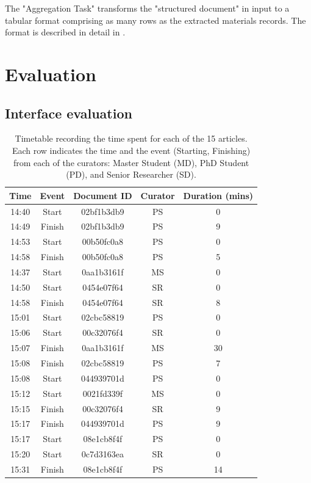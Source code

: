 The "Aggregation Task" transforms the "structured document" in input to a tabular format comprising as many rows as the extracted materials records. The format is described in detail in \cite{lfoppiano2023automatic}.

\section{Evaluation}
\label{app:interface-evaluation-raw}
\subsection{Interface evaluation}

\begin{table}[h]
\centering
\small
\caption{Timetable recording the time spent for each of the 15 articles. Each row indicates the time and the event (Starting, Finishing) from each of the curators: Master Student (MD), PhD Student (PD), and Senior Researcher (SD).}
\begin{tabular}{cc|cc|c}
Time & Event & Document ID & Curator & Duration (mins) \\
\hline
14:40 & Start   & 02bf1b3db9 & PS  & 0  \\
14:49 & Finish  & 02bf1b3db9 & PS  & 9  \\
14:53 & Start   & 00b50fc0a8 & PS  & 0  \\
14:58 & Finish  & 00b50fc0a8 & PS  & 5  \\
14:37 & Start   & 0aa1b3161f & MS  & 0  \\
14:50 & Start   & 0454e07f64 & SR  & 0  \\
14:58 & Finish  & 0454e07f64 & SR  & 8  \\
15:01 & Start   & 02cbc58819 & PS  & 0  \\
15:06 & Start   & 00c32076f4 & SR  & 0  \\
15:07 & Finish  & 0aa1b3161f & MS  & 30 \\
15:08 & Finish  & 02cbc58819 & PS  & 7  \\
15:08 & Start   & 044939701d & PS  & 0  \\
15:12 & Start   & 0021fd339f & MS  & 0  \\
15:15 & Finish  & 00c32076f4 & SR  & 9  \\
15:17 & Finish  & 044939701d & PS  & 9  \\
15:17 & Start   & 08e1cb8f4f & PS  & 0  \\
15:20 & Start   & 0c7d3163ea & SR  & 0  \\
15:31 & Finish  & 08e1cb8f4f & PS  & 14 \\

\end{tabular}
\end{table}
